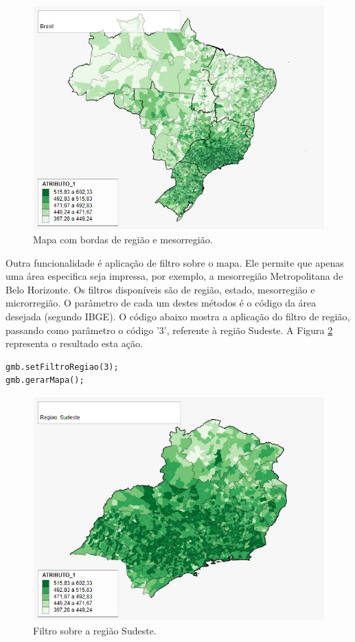 \documentclass[12pt]{article}
\begin{document}
\begin{figure}[!h]
\centering
\includegraphics[scale=0.63]{bordas-regiao-meso.jpg}
\caption{Mapa com bordas de região e mesorregião.}
\label{mapa-bordas}
\end{figure}

Outra funcionalidade é aplicação de filtro sobre o mapa. Ele permite que apenas uma área especifica seja impressa, por exemplo, a mesorregião Metropolitana de Belo Horizonte. Os filtros disponíveis são de região, estado, mesorregião e microrregião. O parâmetro de cada um destes métodos é o código da área desejada (segundo IBGE). O código abaixo mostra a aplicação do filtro de região, passando como parâmetro o código '3', referente à região Sudeste. A Figura \ref{mapaRegiao} representa o resultado esta ação.

\begin{lstlisting}
gmb.setFiltroRegiao(3);
gmb.gerarMapa();
\end{lstlisting}

\begin{figure}[!h]
\centering
\includegraphics[scale=0.63]{regiao.jpg}
\caption{Filtro sobre a região Sudeste.}
\label{mapaRegiao}
\end{figure}
\end{document}
